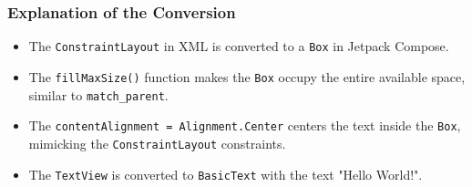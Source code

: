 \documentclass[pdf,
serif,
compress,
xcolor=table,
dvipsnames,
spanish,
aspectratio=169]{beamer}
\begin{document}
\begin{frame}
    \frametitle{Explanation of the Conversion}

    \begin{itemize}
         \item The \texttt{ConstraintLayout} in XML is converted to a \texttt{Box} in Jetpack Compose.
        \item The \texttt{fillMaxSize()} function makes the \texttt{Box} occupy the entire available space, similar to \texttt{match\_parent}.
        \item The \texttt{contentAlignment = Alignment.Center} centers the text inside the \texttt{Box}, mimicking the \texttt{ConstraintLayout} constraints.
        \item The \texttt{TextView} is converted to \texttt{BasicText} with the text "Hello World!".    \end{itemize}

\end{frame}
\end{document}
